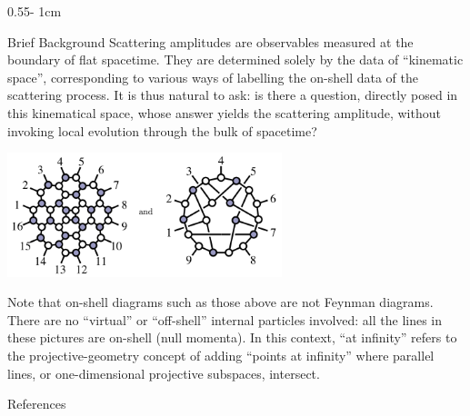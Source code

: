 \documentclass{psuposter}
\begin{document}
\begin{frame}
\begin{columns}[onlytextwidth]
\begin{column}{0.55\textwidth - 1cm}
    \begin{block}{Brief Background}
        Scattering amplitudes are observables measured at the boundary of flat spacetime. They are determined solely by the data of “kinematic space”, corresponding to various ways of labelling the on-shell data of the scattering process. It is thus natural to ask: is there a question, directly posed in this kinematical space, whose answer yields the scattering amplitude, without invoking local evolution through the bulk of spacetime? \cite{arkani-hamedCausalDiamondsCluster2020}
        \begin{center}
	    	\includegraphics[width=0.6\textwidth]{psuposter-images/on-shell}    		
    	\end{center}
		Note that on-shell diagrams such as those above are not Feynman diagrams. There are no “virtual” or “off-shell” internal particles involved: all the lines in these pictures are on-shell (null momenta).  
		In this context, ``at infinity'' refers to the projective-geometry concept of adding ``points at infinity'' where parallel lines, or one-dimensional projective subspaces, intersect.
        \cite{naberTopologyGeometryGauge2011b}
    \end{block}

    \begin{block}{References}
        
		
    \end{block}


\end{column}
\end{columns}
\end{frame}
\end{document}
